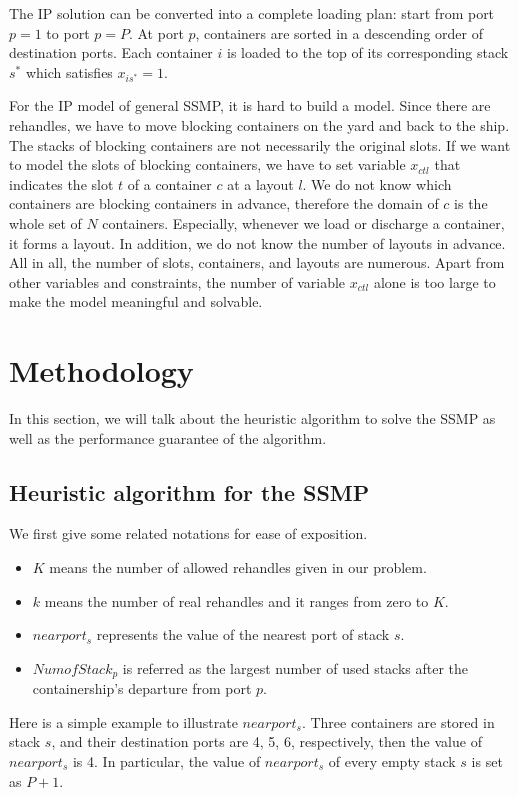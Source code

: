 \documentclass[review,3p,times,authoryear,12pt]{elsarticle}
\begin{document}
The IP solution can be converted into a complete loading plan: start from port $p=1$ to port $p=P$. At port $p$, containers are sorted in a descending order of destination ports. Each container $i$ is loaded to the top of its corresponding stack $s^*$ which satisfies $x_{is^*}=1$.

For the IP model of general SSMP, it is hard to build a model.
Since there are rehandles, we have to move blocking containers on the yard and back to the ship.
The stacks of blocking containers are not necessarily the original slots.
If we want to model the slots of blocking containers, we have to set variable $x_{ctl}$ that indicates the slot $t$ of a container $c$ at a layout $l$.
We do not know which containers are blocking containers in advance, therefore the domain of $c$ is the whole set of $N$ containers.
Especially, whenever we load or discharge a container, it forms a layout.
In addition, we do not know the number of layouts in advance.
All in all, the number of slots, containers, and layouts are numerous. Apart from other variables and constraints, the number of variable $x_{ctl}$ alone is too large to make the model meaningful and solvable.

\section{Methodology}
\label{sec:algo}
In this section, we will talk about the heuristic algorithm to solve the SSMP as well as the performance guarantee of the algorithm.

\subsection{Heuristic algorithm for the SSMP}
\label{sec:h1}
We first give some related notations for ease of exposition.

\begin{itemize}
\item $K$ means the number of allowed rehandles given in our problem.
\item $k$ means the number of real rehandles and it ranges from zero to $K$.
\item $nearport_s$ represents the value of the nearest port of stack $s$.
\item $NumofStack_p$ is referred as the largest number of used stacks after the containership's departure from port $p$.
\end{itemize}

Here is a simple example to illustrate $nearport_s$. Three containers are stored in stack $s$, and their destination ports are 4, 5, 6, respectively, then the value of $nearport_s$ is 4.
In particular, the value of $nearport_s$ of every empty stack $s$ is set as $P+1$.
\end{document}
